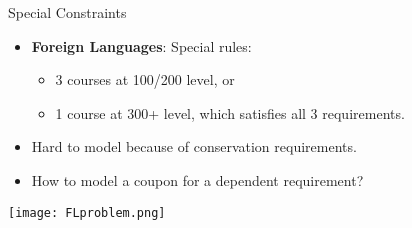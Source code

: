 \documentclass{beamer}
\begin{document}

\begin{frame}{Special Constraints}
    \begin{itemize}
        \item \textbf{Foreign Languages}: Special rules:
        \begin{itemize}
            \item 3 courses at 100/200 level, or
            \item 1 course at 300+ level, which satisfies all 3 requirements.
        \end{itemize}
        \item Hard to model because of conservation requirements. 
        \item How to model a coupon for a dependent requirement?
    \end{itemize}
    
\end{frame}

\begin{frame}
    \centering
    \texttt{[image: FLproblem.png]}
    
\end{frame}
\end{document}
